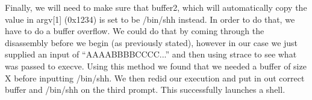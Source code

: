 Finally, we will need to make sure that buffer2, which will automatically copy the value in argv[1] (0x1234) is set to be /bin/shh instead. In order to do that, we have to do a buffer overflow. We could do that by coming through the disassembly before we begin (as previously stated), however in our case we just supplied an input of ``AAAABBBBCCCC...'' and then using strace to see what was passed to execve. Using this method we found that we needed a buffer of size X before inputting /bin/shh. We then redid our execution and put in out correct buffer and /bin/shh on the third prompt. This successfully launches a shell.